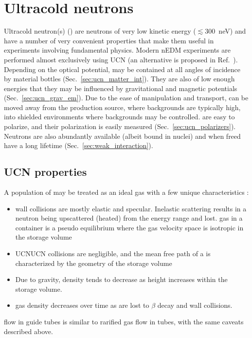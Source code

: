 
\chapter{Ultracold neutrons}\label{chap:UCN}


Ultracold neutron(s) (\ucn) are neutrons of very low kinetic energy ($\lesssim$\qty{300}{\nano\eV}) and have a number of very convenient properties that make them useful in experiments involving fundamental physics. Modern nEDM experiments are performed almost exclusively using UCN \cite{BAK06, SER15, ABE20} (an alternative is proposed in Ref.~\cite{PIE13}). Depending on the optical potential, \ucn may be contained at all angles of incidence by material bottles (Sec.~\ref{sec:ucn_matter_int}). They are also of low enough energies that they may be influenced by gravitational and magnetic potentials (Sec.~\ref{sec:ucn_grav_em}). Due to the ease of manipulation and transport, \ucn can be moved away from the production source, where backgrounds are typically high, into shielded environments where backgrounds may be controlled. \ucn are easy to polarize, and their polarization is easily measured (Sec.~\ref{sec:ucn_polarizers}). Neutrons are also abundantly available (albeit bound in nuclei) and when freed have a long lifetime (Sec.~\ref{sec:weak_interaction}).


\section{UCN properties}


A population of \ucn may be treated as an ideal gas with a few unique characteristics \cite{golubUCN}: 
%
\begin{itemize}
    \item \ucn wall collisions are mostly elastic and specular. Inelastic scattering results in a neutron being upscattered (heated) from the \ucn energy range and lost. \ucn gas in a container is a pseudo equilibrium where the gas velocity space is isotropic in the storage volume
    \item UCN\textendash UCN collisions are negligible, and the mean free path of a \ucn is characterized by the geometry of the storage volume
    \item Due to gravity, \ucn density tends to decrease as height increases within the storage volume.
    \item \ucn gas density decreases over time as \ucn are lost to $\beta$ decay and wall collisions.
\end{itemize}
%
\ucn flow in guide tubes is similar to rarified gas flow in tubes, with the same caveats described above.

